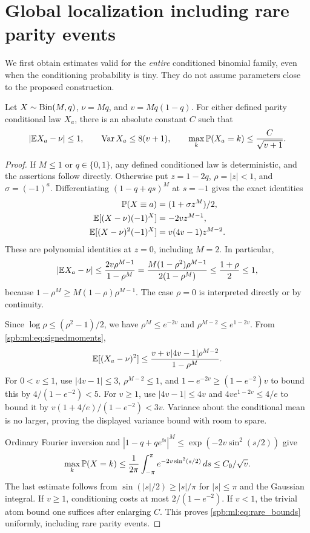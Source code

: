 \section{Global localization including rare parity events}\label{spb:ml:sec:global}
We first obtain estimates valid for the \emph{entire} conditioned binomial family, even when the conditioning probability is tiny. They do not assume parameters close to the proposed construction.

\begin{lemma}\label{spb:ml:lem:rare}
Let $X\sim\operatorname{Bin}(M,q)$, $\nu=Mq$, and $v=Mq(1-q)$. For either defined parity conditional law $X_a$, there is an absolute constant $C$ such that
\begin{equation}\label{spb:ml:eq:rare_bounds}
 |\mathbb E X_a-\nu|\le1,\qquad \operatorname{Var} X_a\le8(v+1),\qquad
 \max_k\mathbb P(X_a=k)\le\frac{C}{\sqrt{v+1}}.
\end{equation}
\end{lemma}
\begin{proof}
If $M\le1$ or $q\in\{0,1\}$, any defined conditioned law is deterministic, and the assertions follow directly. Otherwise put $z=1-2q$, $\rho=|z|<1$, and $\sigma=(-1)^a$. Differentiating $(1-q+qs)^M$ at $s=-1$ gives the exact identities
\begin{align}
 \mathbb P(X\equiv a)&=(1+\sigma z^M)/2,\nonumber\\
 \mathbb E[(X-\nu)(-1)^X]&=-2v z^{M-1},\label{spb:ml:eq:signedmoments}\\
 \mathbb E[(X-\nu)^2(-1)^X]&=v(4v-1)z^{M-2}.\nonumber
\end{align}
These are polynomial identities at $z=0$, including $M=2$. In particular,
\[
 |\mathbb E X_a-\nu|\le\frac{2v\rho^{M-1}}{1-\rho^M}
 =\frac{M(1-\rho^2)\rho^{M-1}}{2(1-\rho^M)}\le\frac{1+\rho}{2}\le1,
\]
because $1-\rho^M\ge M(1-\rho)\rho^{M-1}$. The case $\rho=0$ is interpreted directly or by continuity.

Since $\log\rho\le(\rho^2-1)/2$, we have
$\rho^M\le e^{-2v}$ and $\rho^{M-2}\le e^{1-2v}$. From \eqref{spb:ml:eq:signedmoments},
\[
 \mathbb E[(X_a-\nu)^2]
 \le\frac{v+v|4v-1|\rho^{M-2}}{1-\rho^M}.
\]
For $0<v\le1$, use $|4v-1|\le3$, $\rho^{M-2}\le1$, and
$1-e^{-2v}\ge(1-e^{-2})v$ to bound this by $4/(1-e^{-2})<5$.
For $v\ge1$, use $|4v-1|\le4v$ and $4v e^{1-2v}\le4/e$ to bound it by
$v(1+4/e)/(1-e^{-2})<3v$. Variance about the conditional mean is no larger, proving the displayed variance bound with room to spare.

Ordinary Fourier inversion and $|1-q+qe^{\ii s}|^M\le\exp(-2v\sin^2(s/2))$ give
\[
 \max_k\mathbb P(X=k)\le\frac1{2\pi}\int_{-\pi}^{\pi}
       e^{-2v\sin^2(s/2)}\,ds\le C_0/\sqrt v.
\]
The last estimate follows from $\sin(|s|/2)\ge|s|/\pi$ for $|s|\le\pi$ and the Gaussian integral. If $v\ge1$, conditioning costs at most $2/(1-e^{-2})$. If $v<1$, the trivial atom bound one suffices after enlarging $C$. This proves \eqref{spb:ml:eq:rare_bounds} uniformly, including rare parity events.
\end{proof}

